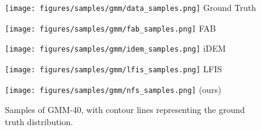 \begin{figure}[!t]
\vspace{-5mm}
    \centering
    \begin{minipage}[t]{0.195\linewidth}
        \centering
        \texttt{[image: figures/samples/gmm/data\_samples.png]}
        Ground Truth
    \end{minipage}
    \begin{minipage}[t]{0.195\linewidth}
        \centering
        \texttt{[image: figures/samples/gmm/fab\_samples.png]}
        FAB
    \end{minipage}
    \begin{minipage}[t]{0.195\linewidth}
        \centering
        \texttt{[image: figures/samples/gmm/idem\_samples.png]}
        iDEM
    \end{minipage}
    \begin{minipage}[t]{0.195\linewidth}
        \centering
        \texttt{[image: figures/samples/gmm/lfis\_samples.png]}
        LFIS
    \end{minipage}
    \begin{minipage}[t]{0.195\linewidth}
        \centering
        \texttt{[image: figures/samples/gmm/nfs\_samples.png]}
        \ours (ours)
    \end{minipage}
    \vspace{-2mm}
    \caption{Samples of GMM-40, with contour lines representing the ground truth distribution.}
    \label{fig:gmm-visualised}
\end{figure}

